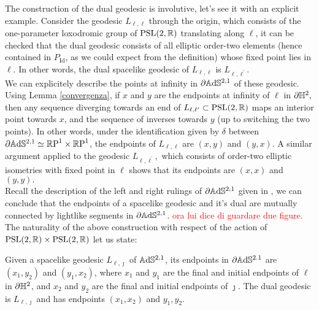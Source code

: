 The construction of the dual geodesic is involutive, let's see it with an explicit example. Consider the geodesic $L_{\ell,\ell}$ through the origin, which consists of the one-parameter loxodromic group of $\text{PSL}(2,\mathbb{R})$ translating along $\ell$, it can be checked that the dual geodesic consists of all elliptic order-two elements (hence contained in $P_{\text{Id}}$, as we could expect from the definition) whose fixed point lies in $\ell$. In other words, the dual spacelike geodesic of $L_{\ell,\ell}$ is $L_{\ell,\ell^{\prime}}.$\\
We can explicitely describe the points at infinity in $\partial\mathbb{A}\mathrm{d}\mathbb{S}^{2,1}$ of these geodesic. Using Lemma \ref{convergenza}, if $x$ and $y$ are the endpoints at infinity of $\ell$ in $\partial\mathbb{H}^2,$ then any sequence diverging towards an end of $L_{\ell,\ell^{\prime}}\subset \text{PSL}(2,\mathbb{R})$ maps an interior point towards $x$, and the sequence of inverses towards $y$ (up to switching the two points). In other words, under the identification given by $\delta$ between $\partial\mathbb{A}\mathrm{d}\mathbb{S}^{2,1}\simeq\mathbb{R}\text{P}^1\times\mathbb{R}\text{P}^1$, the endpoints of $L_{\ell,\ell}$ are $(x,y)$ and $(y,x)$. A similar argument applied to the geodesic $L_{\ell,\ell^{\prime} },$ which consists of order-two elliptic isometries with fixed point in $\ell$ shows that its endpoints are $(x,x)$ and $(y,y).$\\
Recall the description of the left and right rulings of $\partial\mathbb{A}\mathrm{d}\mathbb{S}^{2,1}$ given in , we can conclude that the endpoints of a spacelike geodesic and it's dual are mutually connected by lightlike segments in $\partial\mathbb{A}\mathrm{d}\mathbb{S}^{2,1}$. \textcolor{red}{ora lui dice di guardare due figure.}\\
The naturality of the above construction with respect of the action of $\text{PSL}(2,\mathbb{R})\times\text{PSL}(2,\mathbb{R})$ let us state: 
\begin{proposition}
    Given a spacelike geodesic $L_{\ell,\jmath}$ of $\mathbb{A}\mathrm{d}\mathbb{S}^{2,1}$, its endpoints in $\partial \mathbb{A}\mathrm{d}\mathbb{S}^{2.1}$ are $(x_1,y_2)$ and $(y_1,x_2)$, where $x_1$ and $y_1$ are the final and initial endpoints of $\ell$ in $\partial\mathbb{H}^2$, and $x_2$ and $y_2$ are the final and initial endpoints of $\jmath$. The dual geodesic is $L_{\ell,\jmath}$ and has endpoints $(x_1,x_2)$ and $y_1,y_2.$
\end{proposition}


